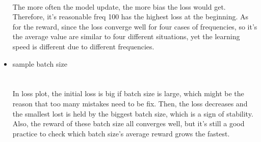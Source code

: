 \documentclass[a4paper]{article}
\begin{document}
\begin{answer}
\begin{itemize}
				\\ 
				The more often the model update, the more bias the loss would get. Therefore, it's reasonable freq 100 has the highest loss at the beginning. As for the reward, since the loss converge well for four cases of frequencies, so it's the average value are similar to four different situations, yet the learning speed is different due to different frequencies.
			\item sample batch size\\
				\\ 
				\\ 
				In loss plot, the initial loss is big if batch size is large, which might be the reason that too many mistakes need to be fix. Then, the loss decreases and the smallest lost is held by the biggest batch size, which is a sign of stability.\\
				Also, the reward of these batch size all converges well, but it's still a good practice to check which batch size's average reward grows the fastest.
				


		\end{itemize}
    \end{answer}
\end{document}
